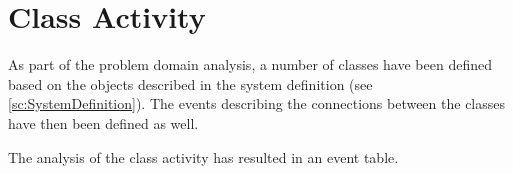 \section{Class Activity} \label{sc:class_activity}
As part of the problem domain analysis, a number of classes have been defined based on the objects described in the system definition (see \autoref{sc:SystemDefinition}). The events describing the connections between the classes have then been defined as well.
\par
The analysis of the class activity has resulted in an event table.